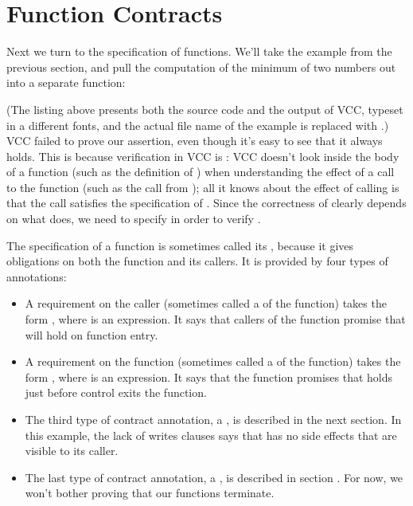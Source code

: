 \section{Function Contracts}
\label{sect:functions}

Next we turn to the specification of functions. We'll take the example
from the previous section, and pull the computation of the minimum of
two numbers out into a separate function:


(The listing above presents both the source code and the output
of VCC, typeset in a different fonts, and 
the actual file name of the example is replaced with .)
VCC failed to prove our assertion, even though it's easy to see that
it always holds. This is because verification in VCC is : 
VCC doesn't look inside the body of a function (such as the definition of ) 
when understanding the effect of a call to the function (such as 
the call from );
all it knows about the effect of calling  is that the call 
satisfies the specification of . 
Since the correctness of  clearly depends on what 
does, we need to specify  in order to verify .

The specification of a function is sometimes called its ,
because it gives obligations on both the function and its callers. It
is provided by four types of annotations:
\begin{itemize}
\item A requirement on the caller (sometimes called a
   of the function) takes the form , 
  where  is an expression. It says that callers of the
  function promise that  will hold on function entry. 

\item A requirement on the function (sometimes called a
   of the function) takes the form , 
  where  is an expression. It says that the function
  promises that  holds just before control exits the
  function. 

\item The third type of contract annotation, a , is described
  in the next section. In this example, the lack of writes clauses says that 
  has no side effects that are visible to its caller.

\item The last type of contract annotation, a ,
  is described in section . For now, we won't bother 
  proving that our functions terminate.
\end{itemize}

